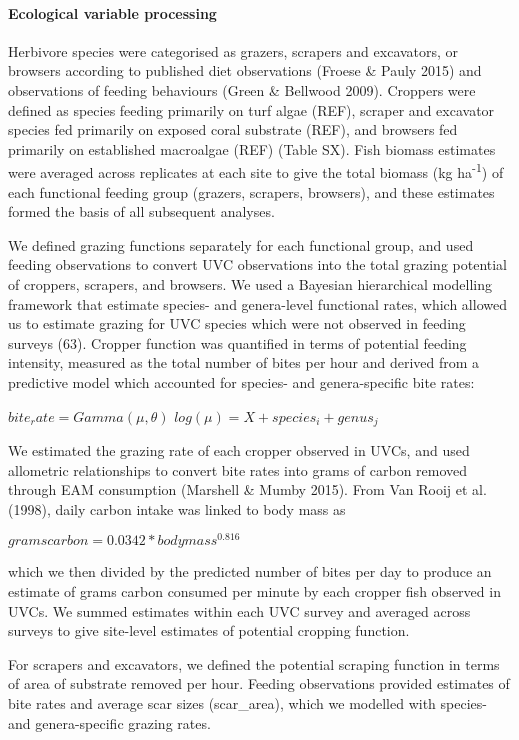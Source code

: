 \documentclass[]{article}
\let\oldparagraph\paragraph
\renewcommand{\paragraph}[1]{\oldparagraph{#1}\mbox{}}
\begin{document}
\hypertarget{ecological-variable-processing}{%
\paragraph{Ecological variable
processing}\label{ecological-variable-processing}}

Herbivore species were categorised as grazers, scrapers and excavators,
or browsers according to published diet observations (Froese \& Pauly
2015) and observations of feeding behaviours (Green \& Bellwood 2009).
Croppers were defined as species feeding primarily on turf algae (REF),
scraper and excavator species fed primarily on exposed coral substrate
(REF), and browsers fed primarily on established macroalgae (REF) (Table
SX). Fish biomass estimates were averaged across replicates at each site
to give the total biomass (kg ha\textsuperscript{-1}) of each functional
feeding group (grazers, scrapers, browsers), and these estimates formed
the basis of all subsequent analyses.

We defined grazing functions separately for each functional group, and
used feeding observations to convert UVC observations into the total
grazing potential of croppers, scrapers, and browsers. We used a
Bayesian hierarchical modelling framework that estimate species- and
genera-level functional rates, which allowed us to estimate grazing for
UVC species which were not observed in feeding surveys (63). Cropper
function was quantified in terms of potential feeding intensity,
measured as the total number of bites per hour and derived from a
predictive model which accounted for species- and genera-specific bite
rates:

\(bite_rate = Gamma(\mu, \theta)\)
\(log(\mu) = X + species_i + genus_j\)

We estimated the grazing rate of each cropper observed in UVCs, and used
allometric relationships to convert bite rates into grams of carbon
removed through EAM consumption (Marshell \& Mumby 2015). From Van Rooij
et al. (1998), daily carbon intake was linked to body mass as

\(grams carbon = 0.0342 * body mass^0.816\)

which we then divided by the predicted number of bites per day to
produce an estimate of grams carbon consumed per minute by each cropper
fish observed in UVCs. We summed estimates within each UVC survey and
averaged across surveys to give site-level estimates of potential
cropping function.

For scrapers and excavators, we defined the potential scraping function
in terms of area of substrate removed per hour. Feeding observations
provided estimates of bite rates and average scar sizes (scar\_area),
which we modelled with species- and genera-specific grazing rates.
\end{document}
